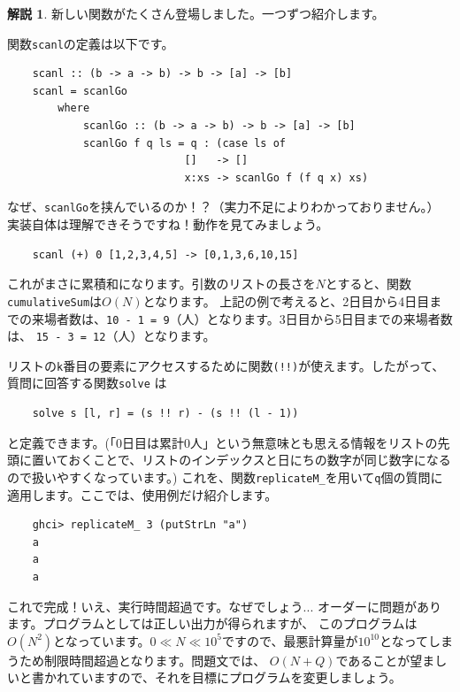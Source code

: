 \documentclass[12pt,a4paper,dvipdfmx,fleqn]{article}%
\theoremstyle{definition}
\theoremstyle{definition}
\newtheorem*{ans*}{解説}
\theoremstyle{definition}
\begin{document}
\begin{ans*}
    新しい関数がたくさん登場しました。一つずつ紹介します。\par
    関数\texttt{scanl}の定義は以下です。
    \begin{verbatim}
    scanl :: (b -> a -> b) -> b -> [a] -> [b]
    scanl = scanlGo
        where
            scanlGo :: (b -> a -> b) -> b -> [a] -> [b]
            scanlGo f q ls = q : (case ls of
                            []   -> []
                            x:xs -> scanlGo f (f q x) xs)
    \end{verbatim}
    \vspace*{-4mm}
    なぜ、\texttt{scanlGo}を挟んでいるのか！？（実力不足によりわかっておりません。）
    実装自体は理解できそうですね！動作を見てみましょう。
    \begin{verbatim}
    scanl (+) 0 [1,2,3,4,5] -> [0,1,3,6,10,15]
    \end{verbatim}
    \vspace*{-4mm}
    これがまさに累積和になります。引数のリストの長さを$N$とすると、関数\texttt{cumulativeSum}は$O(N)$となります。
    上記の例で考えると、2日目から4日目までの来場者数は、\texttt{10 - 1 = 9}（人）となります。3日目から5日目までの来場者数は、
    \texttt{15 - 3 = 12}（人）となります。\par
    リストの\texttt{k}番目の要素にアクセスするために関数\texttt{(!!)}が使えます。したがって、質問に回答する関数\texttt{solve}
    は
    \begin{verbatim}
    solve s [l, r] = (s !! r) - (s !! (l - 1))
    \end{verbatim}
    \vspace*{-4mm}
    と定義できます。(「0日目は累計0人」という無意味とも思える情報をリストの先頭に置いておくことで、リストのインデックスと日にちの数字が同じ数字になるので扱いやすくなっています。)
    これを、関数\texttt{replicateM\_}を用いて\texttt{q}個の質問に適用します。ここでは、使用例だけ紹介します。
    \begin{verbatim}
    ghci> replicateM_ 3 (putStrLn "a")
    a
    a
    a
    \end{verbatim}
    \vspace*{-4mm}
    \par
    これで完成！いえ、実行時間超過です。なぜでしょう... オーダーに問題があります。プログラムとしては正しい出力が得られますが、
    このプログラムは$O(N^2)$となっています。$0\ll N\ll 10^5$ですので、最悪計算量が$10^{10}$となってしまうため制限時間超過となります。問題文では、
    $O(N+Q)$であることが望ましいと書かれていますので、それを目標にプログラムを変更しましょう。\par

\end{ans*}
\end{document}
